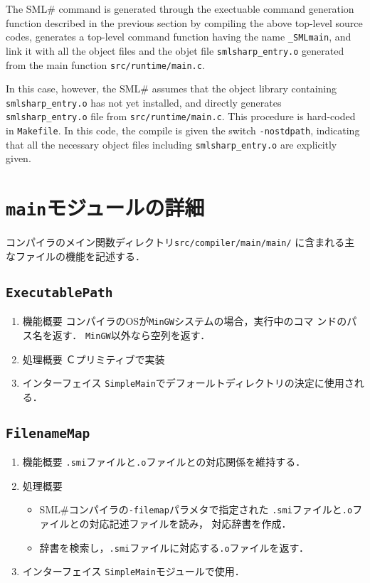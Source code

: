 \documentclass{jbook}
\newif\ifjp
\newcommand{\txt}[2]{#1}
\newcommand{\smlsharp}{SML\#}
\newcommand{\code}[1]{\mbox{\large\tt #1}}
\begin{document}
	The \smlsharp{} command is generated through the 
exectuable command generation function described in the previous section
by compiling the above top-level source codes, generates a top-level
command function having the name \code{\_SMLmain}, and link it with all
the object files and the objet file \code{smlsharp\_entry.o} generated 
from the main function \code{src/runtime/main.c}.

	In this case, however, the \smlsharp{} assumes that the object
library containing \code{smlsharp\_entry.o} has not yet installed, 
and directly generates \code{smlsharp\_entry.o} file from 
\code{src/runtime/main.c}.
	This procedure is hard-coded in \code{Makefile}.
	In this code, the compile is given the switch \code{-nostdpath},
indicating that all the necessary object files including 
\code{smlsharp\_entry.o} are explicitly given.
\fi%

\section{\txt{\code{main}モジュールの詳細}{The details of \code{main} module}}

\ifjp%
	コンパイラのメイン関数ディレクトリ\code{src/compiler/main/main/}
に含まれる主なファイルの機能を記述する．

\subsection{\code{ExecutablePath}}
\begin{enumerate}
\item 機能概要 コンパイラのOSが\code{MinGW}システムの場合，実行中のコマ
ンドのパス名を返す．
	\code{MinGW}以外なら空列を返す．
\item 処理概要 Ｃプリミティブで実装
\item インターフェイス \code{SimpleMain}でデフォールトディレクトリの決定に使用される．
\end{enumerate}
	
\subsection{\code{FilenameMap}}
\begin{enumerate}
\item 機能概要 \code{.smi}ファイルと\code{.o}ファイルとの対応関係を維持する．
\item 処理概要 
\begin{itemize}
\item \smlsharp{}コンパイラの\code{-filemap}パラメタで指定された
\code{.smi}ファイルと\code{.o}ファイルとの対応記述ファイルを読み，
対応辞書を作成．
\item 辞書を検索し，\code{.smi}ファイルに対応する\code{.o}ファイルを返す．
\end{itemize}
\item インターフェイス \code{SimpleMain}モジュールで使用．
\end{enumerate}
\end{document}
